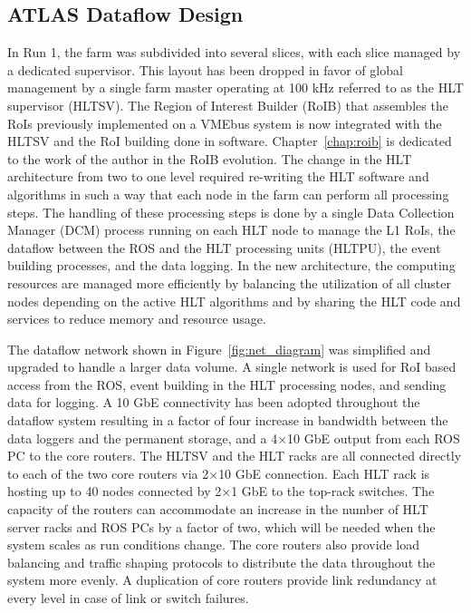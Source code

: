 \subsection{ATLAS Dataflow Design}

In Run 1, the farm was subdivided into several slices, with 
each slice managed by a dedicated supervisor. This layout has been 
dropped in favor of global management by a single farm master 
operating at 100 kHz referred to as the HLT supervisor (HLTSV). 
The Region of Interest Builder (RoIB) that assembles the RoIs
previously implemented on a VMEbus 
system is now integrated with the HLTSV and the RoI building done in software.
Chapter~\ref{chap:roib} is dedicated to the work of the author in the RoIB evolution. 
The change in the HLT architecture from two to one level
required re-writing the HLT software and algorithms in such a way that 
each node in the farm can perform all processing steps. The handling of these
processing steps is done by a single Data Collection Manager (DCM) process 
running on each HLT node to manage the L1 RoIs, the dataflow 
between the ROS and the HLT processing units (HLTPU), 
the event building processes, and the data logging.
 In the new architecture, the computing resources are managed more efficiently
by balancing the utilization of all cluster nodes depending on the active HLT 
algorithms and by sharing the HLT code and services to reduce memory and 
resource usage. 

The dataflow network shown in Figure~\ref{fig:net_diagram} was simplified and upgraded to handle a larger data volume.
A single network is used for 
RoI based access from the ROS, event 
building in the HLT processing nodes, and sending data for logging. 
A 10 GbE connectivity has been adopted throughout  the dataflow system
resulting in a factor of four increase in bandwidth between the data loggers and
the permanent storage, and a 4$\times$10 GbE output from each ROS PC to the core routers. 
The HLTSV and the HLT racks are all connected directly to each of the two core routers via 
 2$\times$10 GbE connection. Each HLT rack is hosting up to 40 nodes connected by 2$\times$1 GbE to the top-rack switches. 
The capacity of the routers can accommodate
an increase in the number of HLT server racks and ROS PCs by a factor of two, 
which will be needed when the system scales as run conditions 
change. The core routers also provide load balancing and traffic shaping protocols \cite{1742-6596-396-1-012033}
to distribute the data throughout the system more evenly. A duplication of core routers provide link redundancy at every level in 
case of link or switch failures.


